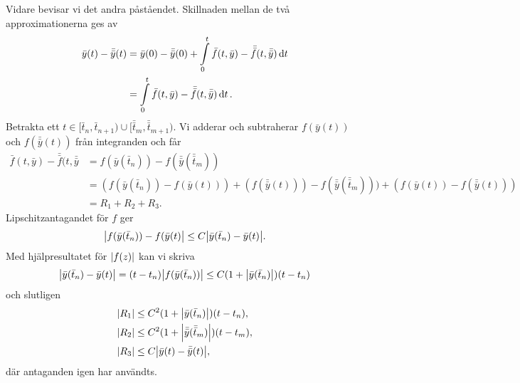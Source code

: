 Vidare bevisar vi det andra påståendet. Skillnaden mellan de två approximationerna ges av
\begin{align*}
	\bar{y}(t) - \bar{\bar{y}}(t) &= \bar{y}(0) - \bar{\bar{y}}(0) + \int\limits_{0}^{t}\bar{f}(t, \bar{y}) - \bar{\bar{f}}(t, \bar{\bar{y}})\dd{t} \\
	                              &= \int\limits_{0}^{t}\bar{f}(t, \bar{y}) - \bar{\bar{f}}(t, \bar{\bar{y}})\dd{t}.
\end{align*}
Betrakta ett $t\in [\bar{t}_{n}, \bar{t}_{n + 1})\cup [\bar{\bar{t}}_{m}, \bar{\bar{t}}_{m + 1})$. Vi adderar och subtraherar $f(\bar{y}(t))$ och $f(\bar{\bar{y}}(t))$ från integranden och får
\begin{align*}
	\bar{f}(t, \bar{y}) - \bar{\bar{f}}(t, \bar{\bar{y}} &= f(\bar{y}(\bar{t}_{n})) - f(\bar{\bar{y}}(\bar{\bar{t}}_{m})) \\
	                                                     &= (f(\bar{y}(\bar{t}_{n})) - f(\bar{y}(t))) + (f(\bar{\bar{y}}(t))) - f(\bar{\bar{y}}(\bar{\bar{t}}_{m}))) + (f(\bar{y}(t)) - f(\bar{\bar{y}}(t))) \\
	                                                     &= R_{1} + R_{2} + R_{3}.
\end{align*}
Lipschitzantagandet för $f$ ger
\begin{align*}
	\abs{f(\bar{y}(\bar{t}_{n})) - f(\bar{y}(t)} \leq C\abs{\bar{y}(\bar{t}_{n}) - \bar{y}(t)}.
\end{align*}
Med hjälpresultatet för $\abs{f(z)}$ kan vi skriva
\begin{align*}
	\abs{\bar{y}(\bar{t}_{n}) - \bar{y}(t)} = (t - t_{n})\abs{f(\bar{y}(\bar{t}_{n}))} \leq C(1 + \abs{\bar{y}(\bar{t}_{n})})(t - t_{n})
\end{align*}
och slutligen
\begin{align*}
	\abs{R_{1}} &\leq C^{2}(1 + \abs{\bar{y}(\bar{t}_{n})})(t - t_{n}), \\
	\abs{R_{2}} &\leq C^{2}(1 + \abs{\bar{\bar{y}}(\bar{\bar{t}}_{m})})(t - t_{m}), \\
	\abs{R_{3}} &\leq C\abs{\bar{y}(t) - \bar{\bar{y}}(t)},
\end{align*}
där antaganden igen har användts.

